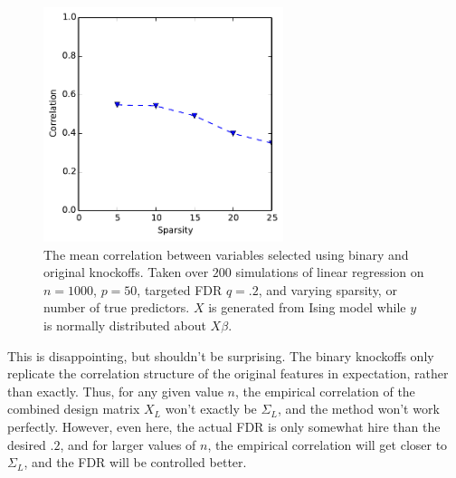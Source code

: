\documentclass[11pt]{article}
\theoremstyle{definition}
\begin{document}
    \begin{figure}[h]
        \begin{center}
        \includegraphics[width=7cm]{images/lasso_corr_50}
    \end{center}
    \caption{The mean correlation between variables selected using binary and original knockoffs. Taken over $200$ simulations of linear regression on $n=1000$, $p=50$, targeted FDR $q=.2$, and varying sparsity, or number of true predictors. $X$ is generated from Ising model while $y$ is normally distributed about $X\beta$.}  
    \end{figure}
    This is disappointing, but shouldn't be surprising. The binary knockoffs only replicate the correlation structure of the original features in expectation, rather than exactly. Thus, for any given value $n$, the empirical correlation of the combined design matrix $X_L$ won't exactly be $\Sigma_L$, and the method won't work perfectly. However, even here, the actual FDR is only somewhat hire than the desired $.2$, and for larger values of $n$, the empirical correlation will get closer to $\Sigma_L$, and the FDR will be controlled better.

    \FloatBarrier
\end{document}
